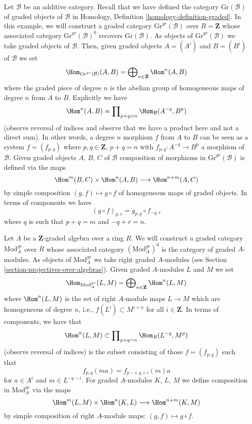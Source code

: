 \begin{example}
\label{example-graded-category-graded-objects}
Let $\mathcal{B}$ be an additive category. Recall that we have defined
the category $\text{Gr}(\mathcal{B})$ of graded objects of $\mathcal{B}$ in
Homology, Definition \ref{homology-definition-graded}.
In this example, we will construct a graded category
$\text{Gr}^{gr}(\mathcal{B})$ over $R = \mathbf{Z}$
whose associated category $\text{Gr}^{gr}(\mathcal{B})^0$
recovers $\text{Gr}(\mathcal{B})$.
As objects of $\text{Gr}^{gr}(\mathcal{B})$
we take graded objects of $\mathcal{B}$. Then, given graded objects
$A = (A^i)$ and $B = (B^i)$ of $\mathcal{B}$ we set
$$
\Hom_{\text{Gr}^{gr}(\mathcal{B})}(A, B) =
\bigoplus\nolimits_{n \in \mathbf{Z}} \Hom^n(A, B)
$$
where the graded piece of degree $n$ is the abelian group of homogeneous
maps of degree $n$ from $A$ to $B$. Explicitly we have
$$
\Hom^n(A, B) = \prod\nolimits_{p + q = n} \Hom_\mathcal{B}(A^{-q}, B^p)
$$
(observe reversal of indices and observe that we have a product here and
not a direct sum). In other words, a degree $n$ morphism $f$
from $A$ to $B$ can be seen as a system $f = (f_{p, q})$ where
$p, q \in \mathbf{Z}$, $p + q = n$ with
$f_{p, q} : A^{-q} \to B^p$ a morphism of $\mathcal{B}$.
Given graded objects $A$, $B$, $C$ of $\mathcal{B}$
composition of morphisms in $\text{Gr}^{gr}(\mathcal{B})$ is defined
via the maps
$$
\Hom^m(B, C) \times \Hom^n(A, B) \longrightarrow \Hom^{n + m}(A, C)
$$
by simple composition $(g, f) \mapsto g \circ f$ of homogeneous
maps of graded objects. In terms of components we have
$$
(g \circ f)_{p, r} = g_{p, q} \circ f_{-q, r}
$$
where $q$ is such that $p + q = m$ and $-q + r = n$.
\end{example}

\begin{example}
\label{example-gm-gr-cat}
Let $A$ be a $\mathbf{Z}$-graded algebra over a ring $R$. We will construct
a graded category $\text{Mod}^{gr}_A$ over $R$ whose associated category
$(\text{Mod}^{gr}_A)^0$ is the category of graded $A$-modules. As objects
of $\text{Mod}^{gr}_A$ we take right graded $A$-modules (see
Section \ref{section-projectives-over-algebras}). Given graded
$A$-modules $L$ and $M$ we set
$$
\Hom_{\text{Mod}^{gr}_A}(L, M) =
\bigoplus\nolimits_{n \in \mathbf{Z}} \Hom^n(L, M)
$$
where $\Hom^n(L, M)$ is the set of right $A$-module maps $L \to M$ which
are homogeneous of degree $n$, i.e., $f(L^i) \subset M^{i + n}$ for
all $i \in \mathbf{Z}$. In terms of components, we have that
$$
\Hom^n(L, M) \subset \prod\nolimits_{p + q = n} \Hom_R(L^{-q}, M^p)
$$
(observe reversal of indices) is the subset consisting of those
$f = (f_{p, q})$ such that
$$
f_{p, q}(m a) = f_{p - i, q + i}(m)a
$$
for $a \in A^i$ and $m \in L^{-q - i}$. For graded $A$-modules
$K$, $L$, $M$ we define composition in $\text{Mod}^{gr}_A$ via
the maps
$$
\Hom^m(L, M) \times \Hom^n(K, L) \longrightarrow \Hom^{n + m}(K, M)
$$
by simple composition of right $A$-module maps: $(g, f) \mapsto g \circ f$.
\end{example}

